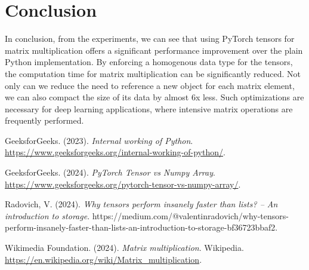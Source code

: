 \documentclass[12pt]{article}
\begin{document}
\section{Conclusion}
In conclusion, from the experiments, we can see that using PyTorch tensors for matrix multiplication
offers a significant performance improvement over the plain Python implementation.
By enforcing a homogenous data type for the tensors, the computation time for matrix multiplication can be significantly reduced.
Not only can we reduce the need to reference a new object for each matrix element, we can also compact the size of its data by almost 6x less.
Such optimizations are necessary for deep learning applications, where intensive matrix operations are frequently performed.

\newpage

\begin{thebibliography}{4}
    GeeksforGeeks. (2023). \textit{Internal working of Python}. \url{https://www.geeksforgeeks.org/internal-working-of-python/}.
    
    GeeksforGeeks. (2024). \textit{PyTorch Tensor vs Numpy Array}. \url{https://www.geeksforgeeks.org/pytorch-tensor-vs-numpy-array/}.

    Radovich, V. (2024). \textit{Why tensors perform insanely faster than lists? -- An introduction to storage}. https://medium.com/@valentinradovich/why-tensors-perform-insanely-faster-than-lists-an-introduction-to-storage-bf36723bbaf2.


    Wikimedia Foundation. (2024). \textit{Matrix multiplication}. Wikipedia. \url{https://en.wikipedia.org/wiki/Matrix_multiplication}.
\end{thebibliography}
\end{document}
